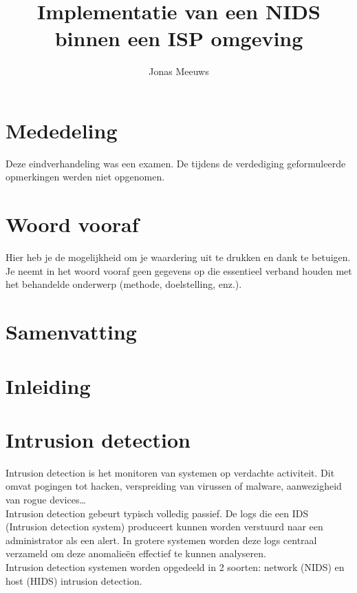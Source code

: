 \documentclass[a4paper,12pt]{report}
\title{Implementatie van een NIDS binnen een ISP omgeving}
\author{Jonas Meeuws}
\begin{document}
\maketitle
%

\newpage
\thispagestyle{empty}
\mbox{}

\maketitle
%

\chapter*{Mededeling}
Deze eindverhandeling was een examen.
De tijdens de verdediging geformuleerde opmerkingen werden niet opgenomen.

\chapter*{Woord vooraf}
Hier heb je de mogelijkheid om je waardering uit te drukken en dank te betuigen. Je neemt in
het woord vooraf geen gegevens op die essentieel verband houden met het behandelde
onderwerp (methode, doelstelling, enz.).

\chapter*{Samenvatting}
\blindtext

\tableofcontents
\newpage

\listoffigures

\chapter*{Inleiding}
\blindtext

\chapter{Intrusion detection}
Intrusion detection is het monitoren van systemen op verdachte activiteit.
Dit omvat pogingen tot hacken, verspreiding van virussen of malware, aanwezigheid van rogue devices\dots
\\
Intrusion detection gebeurt typisch volledig passief.
De logs die een IDS (Intrusion detection system) produceert kunnen worden verstuurd naar een administrator als een alert.
In grotere systemen worden deze logs centraal verzameld om deze anomalieën effectief te kunnen analyseren.
\autocite{wikipedia:ids}
\\
Intrusion detection systemen worden opgedeeld in 2 soorten: network (NIDS) en host (HIDS) intrusion detection.
\end{document}
